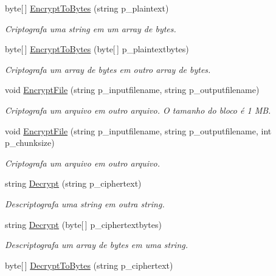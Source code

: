 \begin{DoxyCompactItemize}
byte\mbox{[}$\,$\mbox{]} \hyperlink{classSpartacus_1_1Net_1_1Cryptor_a6754cccd8952bbe30b24e6e25eb532f1}{Encrypt\+To\+Bytes} (string p\+\_\+plaintext)
\begin{DoxyCompactList}\small\item\em Criptografa uma string em um array de bytes. \end{DoxyCompactList}\item 
byte\mbox{[}$\,$\mbox{]} \hyperlink{classSpartacus_1_1Net_1_1Cryptor_ae214f6b814e81b0e4b92b6e5794cf1b3}{Encrypt\+To\+Bytes} (byte\mbox{[}$\,$\mbox{]} p\+\_\+plaintextbytes)
\begin{DoxyCompactList}\small\item\em Criptografa um array de bytes em outro array de bytes. \end{DoxyCompactList}\item 
void \hyperlink{classSpartacus_1_1Net_1_1Cryptor_a3bb69644aa1fdd89b7db8485611bb586}{Encrypt\+File} (string p\+\_\+inputfilename, string p\+\_\+outputfilename)
\begin{DoxyCompactList}\small\item\em Criptografa um arquivo em outro arquivo. O tamanho do bloco é 1 M\+B. \end{DoxyCompactList}\item 
void \hyperlink{classSpartacus_1_1Net_1_1Cryptor_a145685027a2ccab140e2bb99fb9c0bf9}{Encrypt\+File} (string p\+\_\+inputfilename, string p\+\_\+outputfilename, int p\+\_\+chunksize)
\begin{DoxyCompactList}\small\item\em Criptografa um arquivo em outro arquivo. \end{DoxyCompactList}\item 
string \hyperlink{classSpartacus_1_1Net_1_1Cryptor_a726d070b8bd0acb36db75226dc6e0ed5}{Decrypt} (string p\+\_\+ciphertext)
\begin{DoxyCompactList}\small\item\em Descriptografa uma string em outra string. \end{DoxyCompactList}\item 
string \hyperlink{classSpartacus_1_1Net_1_1Cryptor_a5263cb77b7c998c411ff6d989becd883}{Decrypt} (byte\mbox{[}$\,$\mbox{]} p\+\_\+ciphertextbytes)
\begin{DoxyCompactList}\small\item\em Descriptografa um array de bytes em uma string. \end{DoxyCompactList}\item 
byte\mbox{[}$\,$\mbox{]} \hyperlink{classSpartacus_1_1Net_1_1Cryptor_a1e42806a2c32d77fee2cf6fd29fb49ef}{Decrypt\+To\+Bytes} (string p\+\_\+ciphertext)

\end{DoxyCompactItemize}
